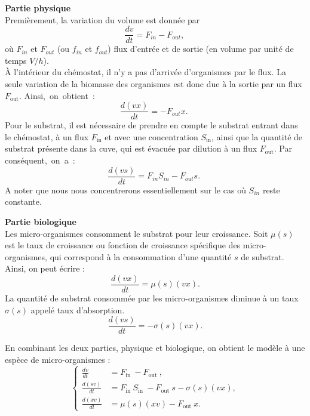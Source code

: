 \documentclass[12pt,a4paper]{report}%
\begin{document}
{\bf Partie physique}\\
Premièrement, la variation du volume est donnée par 
$$
\frac{d v}{d t}=F_{in} - F_{out} \text {, }
$$
où $F_{in}$ et $F_{out}$ (ou $f_{in}$ et $f_{out}$) flux d'entrée et de sortie (en volume par unité de temps $V/h$).\\
À l'intérieur du chémostat, il n'y a pas d'arrivée d'organismes par le flux. La seule variation de la biomasse des organismes est donc due à la sortie par un flux \( F_{\text{out}} \). Ainsi, on obtient :
$$
\frac{d (v x)}{d t}=-F_{out} x  \text {. }
$$
Pour le substrat, il est nécessaire de prendre en compte le substrat entrant dans le chémostat, à un flux \( F_{\text{in}} \) et avec une concentration \( S_{\text{in}} \), ainsi que la quantité de substrat présente dans la cuve, qui est évacuée par dilution à un flux \( F_{\text{out}} \). Par conséquent, on a :
$$
\frac{d (v s)}{d t}=F_{in} S_{in}-F_{out} s \text {. }
$$
A noter que nous nous concentrerons essentiellement sur le cas où $S_{in}$ reste constante.

{\bf Partie biologique}\\
Les micro-organismes consomment le substrat pour leur croissance. Soit $\mu(s)$ est le taux de croissance ou fonction de croissance spécifique des micro-organismes, qui correspond à la consommation d'une quantité $s$ de substrat. Ainsi, on peut écrire :
$$
\frac{d (v x)}{d t}=\mu(s) (v x).
$$
La quantité de substrat consommée par les micro-organismes diminue à un taux $\sigma(s)$ appelé taux d'absorption.
$$
\frac{d (v s)}{d t}=-\sigma(s) (v x).
$$

En combinant les deux parties, physique et biologique, on obtient le modèle à une espèce de micro-organismes :
\begin{equation}\label{1}
  \left\{\begin{aligned} \frac{d v}{d t} & =F_{\text {in }}-F_{\text {out }}, \\
   \frac{d(s v)}{d t} & =F_{\text {in }} S_{\text {in }}-F_{\text {out }} s-\sigma(s)(v x), \\ 
   \frac{d(x v)}{d t} & =\mu (s)(x v)-F_{\text {out }} x .\end{aligned}\right.
\end{equation}
\end{document}
